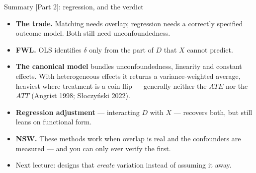 \documentclass[
  11pt,
  ignorenonframetext,
  aspectratio=169,
]{beamer}
\providecommand{\tightlist}{%
  \setlength{\itemsep}{0pt}\setlength{\parskip}{0pt}}
\begin{document}
\begin{frame}{Summary {[}Part 2{]}: regression, and the verdict}
\protect{}\label{summary-part-2-regression-and-the-verdict}
\begin{itemize}
\tightlist
\item
  \textbf{The trade.} Matching needs overlap; regression needs a
  correctly specified outcome model. Both still need unconfoundedness.
\item
  \textbf{FWL.} OLS identifies \(\delta\) only from the part of \(D\)
  that \(X\) cannot predict.
\item
  \textbf{The canonical model} bundles unconfoundedness, linearity and
  constant effects. With heterogeneous effects it returns a
  variance-weighted average, heaviest where treatment is a coin flip ---
  generally neither the \(ATE\) nor the \(ATT\) (Angrist 1998;
  Słoczyński 2022).
\item
  \textbf{Regression adjustment} --- interacting \(D\) with \(X\) ---
  recovers both, but still leans on functional form.
\item
  \textbf{NSW.} These methods work when overlap is real and the
  confounders are measured --- and you can only ever verify the first.
\item
  Next lecture: designs that \emph{create} variation instead of assuming
  it away.
\end{itemize}
\end{frame}
\end{document}
